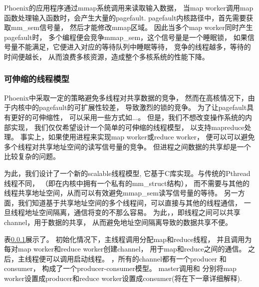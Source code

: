 Phoenix的应用程序通过mmap系统调用来读取输入数据，
当map worker调用map函数处理输入函数时，会产生大量的pagefault.
pagefault内核路径中，首先需要获取mm\_sem信号量，
然后才能修改mmap区域。
因此当多个map worker同时产生pagefault时，
多个编程便会竞争mmap\_sem，这个信号量是一个睡眠锁，
如果信号量不能满足，它便进入对应的等待队列中睡眠等待，
竞争的线程越多，等待的时间便越长，
从而浪费多核资源，造成整个多核系统的性能下降。


\subsubsection{可伸缩的线程模型}
Phoenix中采取一定的策略避免多线程对共享数据的竞争，
然而在高核情况下，由于内核中的pagefault的可扩展性较差，
导致激烈的锁的竞争。
为了让pagefault具有更好的可伸缩性，
可以采用一些方式如\cite{}...。
但是，我们不想改变操作系统的内部实现，
我们仅仅希望设计一个简单的可伸缩的线程模型，
以支持mapreduce处理。
事实上，如果使用进程来实现map worker或reduce worker，
便可以可以避免多个线程对共享地址空间的读写信号量的竞争。
但进程之间数据的共享却是一个比较复杂的问题。

为此，我们设计了一个新的scalable线程模型\myth,
它基于C库实现。与传统的Pthread线程不同，
（即在内核中拥有一个私有的mm\_struct结构），
而不需要与其他的线程共享地址空间，从而可以有效避免mmap\_sem读写信号量的等待。
另一方面，我们知道基于共享地址空间的多个线程间，可以直接与其他的线程通信，
一旦线程地址空间隔离，通信将变的不那么容易。
为此，，即线程之间可以共享channel，用于数据的共享，
从而避免地址空间隔离导致的数据共享不便。

表\ref{}展示了。
初始化情况下，主线程调用分配map和reduce线程，
并且调用为每对map worker和reduce worker创建channel，
用于map和reduce之间的通信。
之后，主线程便可以调用启动线程。
，所有的channel都有一个producer 和 consumer，
构成了一个producer-consumer模型。
master调用和
分别将map worker设置成producer和reduce worker设置成consumer(将在下一章详细解释).

